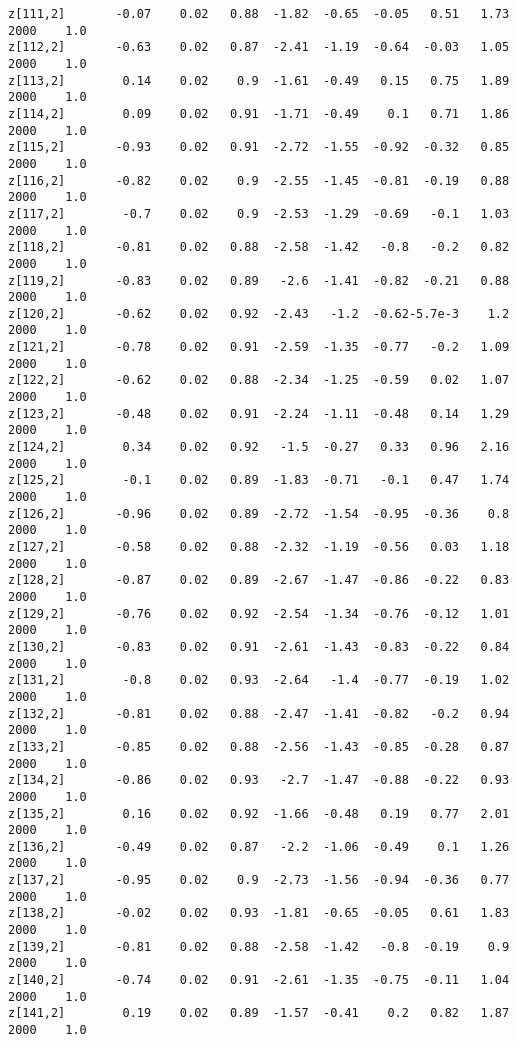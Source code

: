 \documentclass[11pt]{article}
\begin{document}
\begin{Verbatim}[commandchars=\\\{\}]
z[111,2]       -0.07    0.02   0.88  -1.82  -0.65  -0.05   0.51   1.73   2000    1.0
z[112,2]       -0.63    0.02   0.87  -2.41  -1.19  -0.64  -0.03   1.05   2000    1.0
z[113,2]        0.14    0.02    0.9  -1.61  -0.49   0.15   0.75   1.89   2000    1.0
z[114,2]        0.09    0.02   0.91  -1.71  -0.49    0.1   0.71   1.86   2000    1.0
z[115,2]       -0.93    0.02   0.91  -2.72  -1.55  -0.92  -0.32   0.85   2000    1.0
z[116,2]       -0.82    0.02    0.9  -2.55  -1.45  -0.81  -0.19   0.88   2000    1.0
z[117,2]        -0.7    0.02    0.9  -2.53  -1.29  -0.69   -0.1   1.03   2000    1.0
z[118,2]       -0.81    0.02   0.88  -2.58  -1.42   -0.8   -0.2   0.82   2000    1.0
z[119,2]       -0.83    0.02   0.89   -2.6  -1.41  -0.82  -0.21   0.88   2000    1.0
z[120,2]       -0.62    0.02   0.92  -2.43   -1.2  -0.62-5.7e-3    1.2   2000    1.0
z[121,2]       -0.78    0.02   0.91  -2.59  -1.35  -0.77   -0.2   1.09   2000    1.0
z[122,2]       -0.62    0.02   0.88  -2.34  -1.25  -0.59   0.02   1.07   2000    1.0
z[123,2]       -0.48    0.02   0.91  -2.24  -1.11  -0.48   0.14   1.29   2000    1.0
z[124,2]        0.34    0.02   0.92   -1.5  -0.27   0.33   0.96   2.16   2000    1.0
z[125,2]        -0.1    0.02   0.89  -1.83  -0.71   -0.1   0.47   1.74   2000    1.0
z[126,2]       -0.96    0.02   0.89  -2.72  -1.54  -0.95  -0.36    0.8   2000    1.0
z[127,2]       -0.58    0.02   0.88  -2.32  -1.19  -0.56   0.03   1.18   2000    1.0
z[128,2]       -0.87    0.02   0.89  -2.67  -1.47  -0.86  -0.22   0.83   2000    1.0
z[129,2]       -0.76    0.02   0.92  -2.54  -1.34  -0.76  -0.12   1.01   2000    1.0
z[130,2]       -0.83    0.02   0.91  -2.61  -1.43  -0.83  -0.22   0.84   2000    1.0
z[131,2]        -0.8    0.02   0.93  -2.64   -1.4  -0.77  -0.19   1.02   2000    1.0
z[132,2]       -0.81    0.02   0.88  -2.47  -1.41  -0.82   -0.2   0.94   2000    1.0
z[133,2]       -0.85    0.02   0.88  -2.56  -1.43  -0.85  -0.28   0.87   2000    1.0
z[134,2]       -0.86    0.02   0.93   -2.7  -1.47  -0.88  -0.22   0.93   2000    1.0
z[135,2]        0.16    0.02   0.92  -1.66  -0.48   0.19   0.77   2.01   2000    1.0
z[136,2]       -0.49    0.02   0.87   -2.2  -1.06  -0.49    0.1   1.26   2000    1.0
z[137,2]       -0.95    0.02    0.9  -2.73  -1.56  -0.94  -0.36   0.77   2000    1.0
z[138,2]       -0.02    0.02   0.93  -1.81  -0.65  -0.05   0.61   1.83   2000    1.0
z[139,2]       -0.81    0.02   0.88  -2.58  -1.42   -0.8  -0.19    0.9   2000    1.0
z[140,2]       -0.74    0.02   0.91  -2.61  -1.35  -0.75  -0.11   1.04   2000    1.0
z[141,2]        0.19    0.02   0.89  -1.57  -0.41    0.2   0.82   1.87   2000    1.0

\end{Verbatim}
\end{document}

